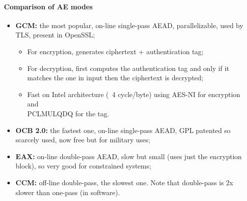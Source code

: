 \paragraph{Comparison of AE modes}
\begin{itemize}
    \item \textbf{GCM:} the most popular, on-line single-pass AEAD, parallelizable, used by TLS, present in OpenSSL;
          \begin{itemize}
              \item For encryption, generates ciphertext + authentication tag;
              \item For decryption, first computes the authentication tag and only if it matches the one in input then the ciphertext is decrypted;
              \item Fast on Intel architecture (~4 cycle/byte) using AES-NI for encryption and \\
              PCLMULQDQ for the tag.
          \end{itemize}
    \item \textbf{OCB 2.0:} the fastest one, on-line single-pass AEAD, GPL patented so scarcely used, now free but for military uses;
    \item \textbf{EAX:} on-line double-pass AEAD, slow but small (uses just the encryption block), so very good for constrained systems;
    \item \textbf{CCM:} off-line double-pass, the slowest one. Note that double-pass is 2x slower than one-pass (in software).
\end{itemize}

